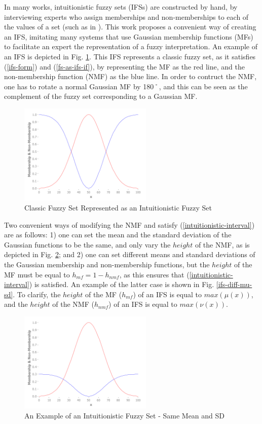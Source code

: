 \documentclass[conference]{IEEEtran}
\begin{document}
In many works, intuitionistic fuzzy sets (IFSs) are constructed by
hand, by interviewing experts who assign memberships and
non-memberships to each of the values of a set (such as in
\cite{davarzani2013novel}). This work proposes a convenient way of
creating an IFS, imitating many systems that use Gaussian
membership functions (MFs) to facilitate an expert the representation of a
fuzzy interpretation. An example of an IFS is depicted in
Fig. \ref{fs-as-ifs}. This IFS represents a classic fuzzy set, as it
satisfies (\ref{ifs-form}) and (\ref{fs-as-ifs-if}), by representing
the MF as the red line, and the non-membership
function (NMF) as the blue line. In order to contruct the NMF, one has
to rotate a normal Gaussian MF by 180˚, and this can be seen as the
complement of the fuzzy set corresponding to a Gaussian MF.

\begin{figure}[!t]
  \centering
  \includegraphics[width=2.5in]{fs-as-ifs}
  \caption{Classic Fuzzy Set Represented as an Intuitionistic Fuzzy Set}
  \label{fs-as-ifs}
\end{figure}

Two convenient ways of modifying the NMF and
satisfy (\ref{intuitionistic-interval}) are as follows: 1) one can set
the mean and the standard deviation of the Gaussian functions to be
the same, and only vary the $height$ of the NMF,
as is depicted in Fig. \ref{ifs}; and 2) one can set different means and
standard deviations of the Gaussian membership and non-membership
functions, but the $height$ of the MF must be equal
to $h_{mf} = 1 - h_{nmf}$, as this ensures that
(\ref{intuitionistic-interval}) is satisfied. An example of the latter
case is shown in Fig. \ref{ifs-diff-mu-sd}. To clarify, the $height$
of the MF ($h_{mf}$) of an IFS is equal to $max(\mu(x))$, and the
$height$ of the NMF ($h_{nmf}$) of an IFS is equal to $max(\nu(x))$.

\begin{figure}[!t]
  \centering
  \includegraphics[width=2.5in]{ifs}
  \caption{An Example of an Intuitionistic Fuzzy Set - Same Mean and SD}
  \label{ifs}
\end{figure}
\end{document}
